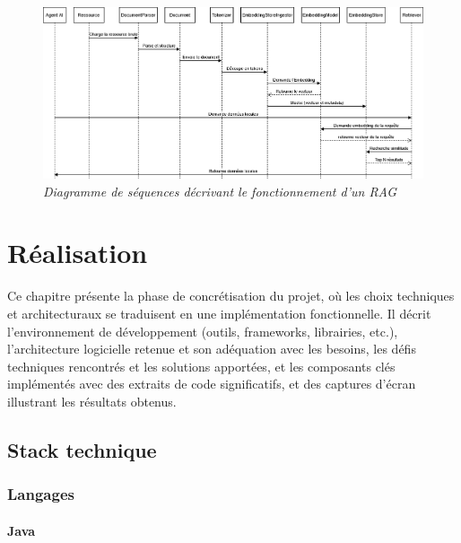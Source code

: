 \documentclass[12pt,a4paper]{report}
\begin{document}
	\begin{figure}[H]
		\centering
		\includegraphics[width=\textwidth]{ds-rag.drawio.png}
		\caption{\textit{Diagramme de séquences décrivant le fonctionnement d'un RAG}}
		\label{fig:ds-rag.drawio}
	\end{figure}
	
	\chapter{Réalisation}
	
	Ce chapitre présente la phase de concrétisation du projet, où les choix techniques et architecturaux se traduisent en une implémentation fonctionnelle. Il décrit l'environnement de développement (outils, frameworks, librairies, etc.), l'architecture logicielle retenue et son adéquation avec les besoins, les défis techniques rencontrés et les solutions apportées, et les composants clés implémentés avec des extraits de code significatifs, et des captures d'écran illustrant les résultats obtenus.

	\section{Stack technique}
	
	\subsection{Langages}
	
	\subsubsection{Java}
	
\end{document}
